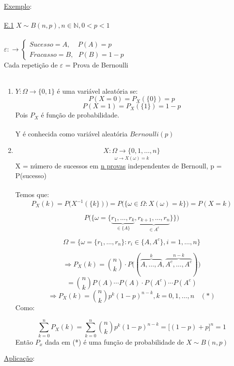 \documentclass[a4paper,12pt]{article}
\begin{document}
\newpage
\underline{Exemplo}:\\
\\
\underline{E.1} $X\sim B(n,p),n \in \mathbb{N}, 0<p<1 $\\
\\
$\varepsilon:\rightarrow\begin{cases}
	Sucesso = A, \ \ \ \ \ P(A)=p\\
	Fracasso = B, \ \ \ P(B)=1-p
\end{cases}$\\
Cada repetição de  $\varepsilon$ = Prova de Bernoulli\\
\\
\begin{enumerate}[label=\alph*)]
	\item 

$Y:\Omega \longrightarrow \{0,1\} $ é uma variável aleatória se:
$$P(X=0)=P_X(\{0\})=p $$
$$P(X=1)=P_X(\{1\})=1-p $$
Pois $P_X$ é função de probabilidade.\\
\\
Y é conhecida como variável aleatória $Bernoulli(p)$

\item  $$\underset{\omega \longrightarrow X(\omega)=k}{X:\Omega \longrightarrow \{0,1,\ldots,n\}}$$
X = número de sucessos em \underline{n provas} independentes de Bernoull, p = P(sucesso)\\
\\
Temos que:
$$P_X(k)=P\bigg( X^{-1}(\{k\})\bigg)=P\bigg(\{ \omega \in \Omega: X(\omega)=k \}\bigg)=P(X=k) $$

$$P\bigg( \bigg\{\omega =\{\underbrace{r_1,\ldots, r_k}_{\in \{A\}},\underbrace{r_{k+1},\ldots, r_n}_{\in A^c} \} \bigg\} \bigg) $$


$$\Omega = \bigg\{ \omega=\{ r_1,\ldots,r_n\}: r_i \in \{ A,A^c \},i=1,\ldots,n \bigg\}$$

$$\Rightarrow P_X(k)=\binom{n}{k}\cdot P\bigg( (\overbrace{A,\ldots,A}^{k},\overbrace{A^c,\ldots,A^c}^{n-k}) \bigg)  $$
$$= \binom{n}{k}P(A)\cdots P(A)\cdot P(A^c)\cdots P(A^c) $$
$$\Rightarrow P_X(k)= \binom{n}{k} p^k (1-p)^{n-k}, k=0,1,\ldots,n\ \ \ \ (*)$$
Como:

$$\sum\limits_{k=0}^{n}P_X(k) = \sum\limits_{k=0}^{n}\binom{n}{k} p^k (1-p)^{n-k} = \bigg[ (1-p)+p\bigg]^n=1 $$
Então $P_x$ dada em (*) é uma função de probabilidade de $X\sim B(n,p)$

\end{enumerate}
\newpage
\underline{Aplicação}:\\
\\
\end{document}
